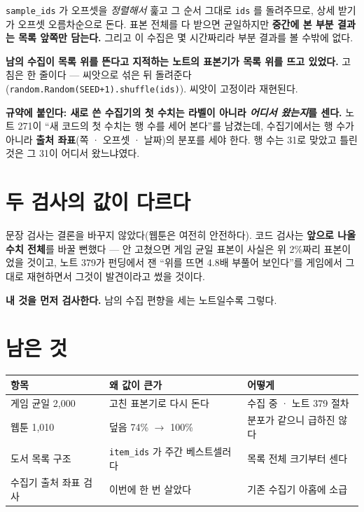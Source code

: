 \documentclass[11pt]{article}
\begin{document}
\texttt{sample\_ids} 가 오프셋을 \emph{정렬해서} 훑고 그 순서 그대로
\texttt{ids} 를 돌려주므로, 상세 받기가 오프셋 오름차순으로 돈다. 표본
전체를 다 받으면 균일하지만 \textbf{중간에 본 부분 결과는 목록 앞쪽만
담는다.} 그리고 이 수집은 몇 시간짜리라 부분 결과를 볼 수밖에 없다.

\textbf{남의 수집이 목록 위를 뜬다고 지적하는 노트의 표본기가 목록 위를
뜨고 있었다.} 고침은 한 줄이다 --- 씨앗으로 섞은 뒤 돌려준다
(\texttt{random.Random(SEED+1).shuffle(ids)}). 씨앗이 고정이라 재현된다.

\textbf{규약에 붙인다: 새로 쓴 수집기의 첫 수치는 라벨이 아니라 \emph{어디서
왔는지}를 센다.} 노트 271이 ``새 코드의 첫 수치는 행 수를 세어 본다''를
남겼는데, 수집기에서는 행 수가 아니라 \textbf{출처 좌표}(쪽 · 오프셋 ·
날짜)의 분포를 세야 한다. 행 수는 31로 맞았고 틀린 것은 그 31이 어디서
왔느냐였다.

\section{두 검사의 값이 다르다}

문장 검사는 결론을 바꾸지 않았다(웹툰은 여전히 안전하다). 코드 검사는
\textbf{앞으로 나올 수치 전체}를 바꿀 뻔했다 --- 안 고쳤으면 게임 균일
표본이 사실은 위 2\%짜리 표본이었을 것이고, 노트 379가 펀딩에서 잰
``위를 뜨면 4.8배 부풀어 보인다''를 게임에서 그대로 재현하면서 그것이
발견이라고 썼을 것이다.

\textbf{내 것을 먼저 검사한다.} 남의 수집 편향을 세는 노트일수록 그렇다.

\section{남은 것}

\begin{center}
\begin{tabular}{lll}
\hline
항목 & 왜 값이 큰가 & 어떻게 \\
\hline
게임 균일 2,000 & 고친 표본기로 다시 돈다 & 수집 중 · 노트 379 절차 \\
웹툰 1,010 & 덮음 74\% $\to$ 100\% & 분포가 같으니 급하진 않다 \\
도서 목록 구조 & \texttt{item\_ids} 가 주간 베스트셀러다 & 목록 전체 크기부터 센다 \\
수집기 출처 좌표 검사 & 이번에 한 번 살았다 & 기존 수집기 아홉에 소급 \\
\hline
\end{tabular}
\end{center}
\end{document}
